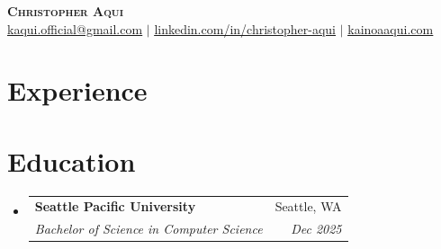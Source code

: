 \documentclass[letterpaper,11pt]{article}
\makeatletter
\newcommand{\resumeItem}[1]{\item\small{{#1 \vspace{-2pt}}}}
\newcommand{\resumeSubheading}[4]{
  \vspace{-2pt}\item
    \begin{tabular*}{0.97\textwidth}[t]{l@{\extracolsep{\fill}}r}
      \textbf{#1} & #2 \\
      \textit{\small#3} & \textit{\small #4} \\
    \end{tabular*}\vspace{-7pt}
}
\newcommand{\resumeSubHeadingListStart}{\begin{itemize}[leftmargin=0.15in, label={}]}
\newcommand{\resumeSubHeadingListEnd}{\end{itemize}}
\newcommand{\resumeItemListStart}{\begin{itemize}}
\newcommand{\resumeItemListEnd}{\end{itemize}\vspace{-5pt}}
\makeatother
\begin{document}
\begin{center}
    \textbf{\Huge \scshape Christopher Aqui} \\ \vspace{1pt}
    \small  \href{mailto:kaqui.official@gmail.com}{\underline{kaqui.official@gmail.com}} $|$
    \href{https://linkedin.com/in/christopher-aqui}{\underline{linkedin.com/in/christopher-aqui}} $|$
    \href{https://www.kainoaaqui.com}{\underline{kainoaaqui.com}}
\end{center}

\section{Experience}
  \resumeSubHeadingListStart



\resumeSubHeadingListEnd

\section{Education}
  \resumeSubHeadingListStart
    \resumeSubheading
      {Seattle Pacific University}{Seattle, WA}
      {Bachelor of Science in Computer Science}{Dec 2025}
  \resumeSubHeadingListEnd


\end{document}
